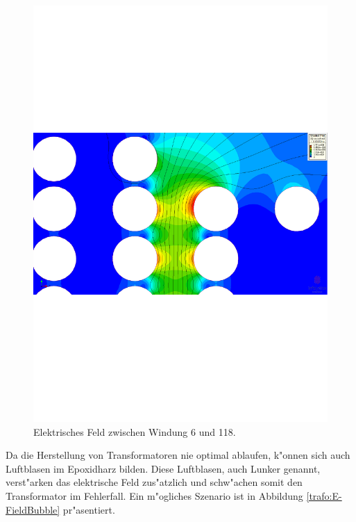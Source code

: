\begin{refsection}
\begin{figure}
	\centering
	\includegraphics[width=\textwidth]{./trafo/images/VoltageTrans.pdf}
	\caption{Elektrisches Feld zwischen Windung 6 und 118.}
	\label{trafo:E-FieldZoom}
\end{figure}

Da die Herstellung von Transformatoren nie optimal ablaufen, k"onnen sich auch Luftblasen im Epoxidharz bilden. Diese Luftblasen, auch Lunker genannt, verst"arken das elektrische Feld zus"atzlich und schw"achen somit den Transformator im Fehlerfall. Ein m"ogliches Szenario ist in Abbildung \ref{trafo:E-FieldBubble} pr"asentiert. 


\end{refsection}
